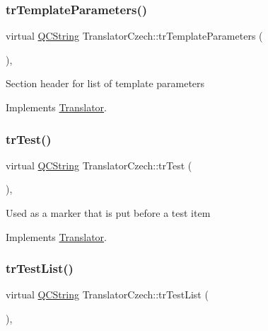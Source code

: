 \subsubsection{\texorpdfstring{trTemplateParameters()}{trTemplateParameters()}}
{\footnotesize\ttfamily virtual \mbox{\hyperlink{class_q_c_string}{Q\+C\+String}} Translator\+Czech\+::tr\+Template\+Parameters (\begin{DoxyParamCaption}{ }\end{DoxyParamCaption})\hspace{0.3cm}{\ttfamily [inline]}, {\ttfamily [virtual]}}

Section header for list of template parameters 

Implements \mbox{\hyperlink{class_translator}{Translator}}.

\mbox{\label{class_translator_czech_a2273a0483e4356daf69934962e8a75ab}} 
\subsubsection{\texorpdfstring{trTest()}{trTest()}}
{\footnotesize\ttfamily virtual \mbox{\hyperlink{class_q_c_string}{Q\+C\+String}} Translator\+Czech\+::tr\+Test (\begin{DoxyParamCaption}{ }\end{DoxyParamCaption})\hspace{0.3cm}{\ttfamily [inline]}, {\ttfamily [virtual]}}

Used as a marker that is put before a test item 

Implements \mbox{\hyperlink{class_translator}{Translator}}.

\mbox{\label{class_translator_czech_a9b32d2286210da8996bb6abd0ddcbe7c}} 
\subsubsection{\texorpdfstring{trTestList()}{trTestList()}}
{\footnotesize\ttfamily virtual \mbox{\hyperlink{class_q_c_string}{Q\+C\+String}} Translator\+Czech\+::tr\+Test\+List (\begin{DoxyParamCaption}{ }\end{DoxyParamCaption})\hspace{0.3cm}{\ttfamily [inline]}, {\ttfamily [virtual]}}

